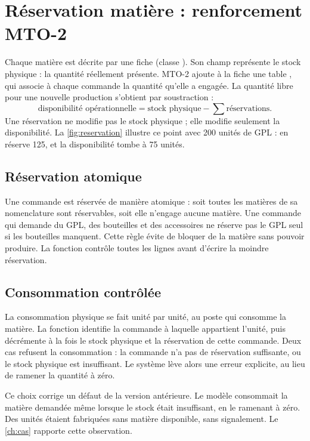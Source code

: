 \chapter{Réservation matière : renforcement MTO-2}\label{ch:mto2}

Chaque matière est décrite par une fiche (classe ). Son champ
 représente le stock physique : la quantité réellement présente. MTO-2
ajoute à la fiche une table , qui associe à chaque commande la quantité
qu'elle a engagée. La quantité libre pour une nouvelle production s'obtient par soustraction :
\[
\text{disponibilité opérationnelle} = \text{stock physique} - \sum \text{réservations}.
\]
Une réservation ne modifie pas le stock physique ; elle modifie seulement la disponibilité.
La \cref{fig:reservation} illustre ce point avec 200 unités de GPL :  en réserve
125, et la disponibilité tombe à 75 unités.



\section{Réservation atomique}

Une commande est réservée de manière atomique : soit toutes les matières de sa nomenclature
sont réservables, soit elle n'engage aucune matière. Une commande qui demande du GPL, des
bouteilles et des accessoires ne réserve pas le GPL seul si les bouteilles manquent. Cette
règle évite de bloquer de la matière sans pouvoir produire. La fonction
 contrôle toutes les lignes avant d'écrire la moindre
réservation.

\section{Consommation contrôlée}

La consommation physique se fait unité par unité, au poste qui consomme la matière. La
fonction  identifie la commande à laquelle appartient l'unité,
puis décrémente à la fois le stock physique et la réservation de cette commande. Deux cas
refusent la consommation : la commande n'a pas de réservation suffisante, ou le stock
physique est insuffisant. Le système lève alors une erreur explicite, au lieu de ramener la
quantité à zéro.

Ce choix corrige un défaut de la version antérieure. Le modèle consommait la matière demandée
même lorsque le stock était insuffisant, en le ramenant à zéro. Des unités étaient fabriquées
sans matière disponible, sans signalement. Le \cref{ch:cas} rapporte cette observation.

